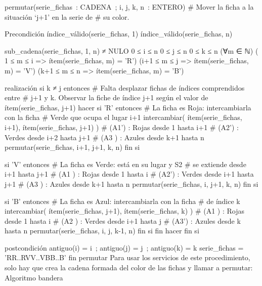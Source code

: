 permutar(serie_fichas : CADENA ; i, j, k, n : ENTERO)
    # Mover la ficha a la situación `j+1' en la serie de 
    # su color.

Precondición
    índice_válido(serie_fichas, 1)
    índice_válido(serie_fichas, n)

    sub_cadena(serie_fichas, 1, n) ≠ NULO
    0 ≤ i ≤ n 
    0 ≤ j ≤ n
    0 ≤ k ≤ n
    (∀m ∈ ℕ)
           (  1 ≤ m ≤ i => ítem(serie_fichas, m) = 'R')
           (i+1 ≤ m ≤ j => ítem(serie_fichas, m) = 'V')
           (k+1 ≤ m ≤ n => ítem(serie_fichas, m) = 'B')

realización
    si k ≠ j entonces
        # Falta desplazar fichas de índices comprendidos entre 
        # j+1 y k. Observar la fiche de índice j+1
        según el valor de
            ítem(serie_fichas, j+1)
        hacer
            si 'R' entonces
                # La ficha es Roja: intercambiarla con la ficha
                # Verde que ocupa el lugar i+1
                intercambiar(
                          ítem(serie_fichas, i+1),
                          ítem(serie_fichas, j+1)
                        )
                # (A1') : Rojas desde 1 hasta i+1
                # (A2') : Verdes desde i+2 hasta j+1
                # (A3 ) : Azules desde k+1 hasta n
                permutar(serie_fichas, i+1, j+1, k, n)
            fin si

            si 'V' entonces
                # La ficha es Verde: está en su lugar y S2
                # se extiende desde i+1 hasta j+1
                # (A1 ) : Rojas desde 1 hasta i
                # (A2') : Verdes desde i+1 hasta j+1
                # (A3 ) : Azules desde k+1 hasta n
                permutar(serie_fichas, i, j+1, k, n)
            fin si

            si 'B' entonces
                # La ficha es Azul: intercambiarla con la ficha
                # de índice k
                intercambiar(
                          ítem(serie_fichas, j+1),
                          ítem(serie_fichas, k)
                        )
                # (A1 ) : Rojas desde 1 hasta i
                # (A2 ) : Verdes desde i+1 hasta j
                # (A3') : Azules desde k hasta n
                permutar(serie_fichas, i, j, k-1, n)
            fin si
        fin hacer
    fin si

postcondición
    antiguo(i) = i ; antiguo(j) = j ; antiguo(k) = k
    serie_fichas = 'RR..RVV..VBB..B'
fin permutar
Para usar los servicios de este procedimiento, solo hay que crea la cadena formada del color de las fichas y llamar a permutar:
Algoritmo bandera

